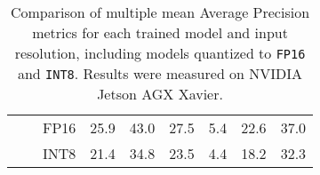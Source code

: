 \begin{appendices}
\begin{table}[t]
\begin{threeparttable}
\begin{tabular}{|c|c|c|rrrrrr|}
                                        &                                  & FP16 & 25.9 & 43.0 & 27.5 &  5.4 & 22.6 & 37.0 \\
                                        &                                  & INT8 & 21.4 & 34.8 & 23.5 &  4.4 & 18.2 & 32.3 \\
            \hline
        \end{tabular}
        \caption{Comparison of multiple mean Average Precision metrics for each
        trained model and input resolution, including models quantized to
        \texttt{FP16} and \texttt{INT8}. Results were measured on NVIDIA Jetson AGX
        Xavier.}
        \label{mAPTableBigFig}
    \end{threeparttable}
    \normalsize
\end{table}


\end{appendices}

% 